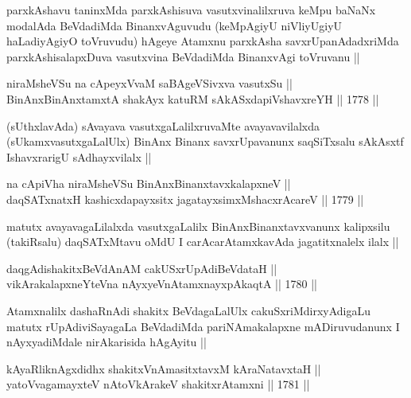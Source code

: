 \begin{artha}
parxkAshavu taninxMda parxkAshisuva vasutxvinalilxruva keMpu baNaNx
modalAda BeVdadiMda BinanxvAguvudu (keMpAgiyU niVliyUgiyU haLadiyAgiyO
toVruvudu) hAgeye Atamxnu parxkAsha savxrUpanAdadxriMda
parxkAshisalapxDuva vasutxvina BeVdadiMda BinanxvAgi toVruvanu ||
\end{artha}


\begin{shl}
niraMsheVSu na cApeyxVvaM saBAgeVSivxva vasutxSu || \\
BinAnxBinAnxtamxtA shakAyx katuRM sAkASxdapiVshavxreYH ||  1778 ||  
\end{shl}

\begin{artha}
(sUthxlavAda) sAvayava vasutxgaLalilxruvaMte avayavavilalxda
  (sUkamxvasutxgaLalUlx) BinAnx Binanx savxrUpavanunx saqSiTxsalu
  sAkAsxtf IshavxrarigU sAdhayxvilalx ||
\end{artha}

\begin{shl}
na cApiVha niraMsheVSu BinAnxBinanxtavxkalapxneV || \\
daqSATxnatxH kashicxdapayxsitx jagatayxsimxMshacxrAcareV ||  1779 ||  
\end{shl}

\begin{artha}
matutx avayavagaLilalxda vasutxgaLalilx BinAnxBinanxtavxvanunx
kalipxsilu (takiRsalu) daqSATxMtavu oMdU I carAcarAtamxkavAda
jagatitxnalelx ilalx ||
\end{artha}

\begin{shl}
daqgAdishakitxBeVdAnAM cakUSxrUpAdiBeVdataH || \\
vikArakalapxneYteVna nAyxyeVnA\s \s tamxnayxpAkaqtA ||  1780 || 
\end{shl}

\begin{artha}
Atamxnalilx dashaRnAdi shakitx BeVdagaLalUlx cakuSxriMdirxyAdigaLu
matutx rUpAdiviSayagaLa BeVdadiMda pariNAmakalapxne mADiruvudanunx I
nAyxyadiMdale nirAkarisida hAgAyitu ||
\end{artha}


\begin{shl}
kAyaRliknAgxdidhx shakitxVnAmasitxtavxM kAraNatavxtaH || \\
yatoV\s vagamayxteV nAtoV\s kArakeV shakitxrAtamxni ||  1781 ||  
\end{shl}

